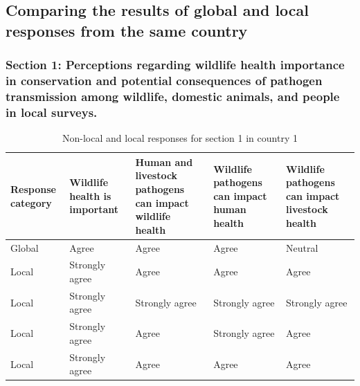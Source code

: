 \documentclass[
  letterpaper,
  DIV=11,
  numbers=noendperiod]{scrartcl}
\begin{document}
\hypertarget{comparing-the-results-of-global-and-local-responses-from-the-same-country}{%
\subsection{Comparing the results of global and local responses from the
same
country}\label{comparing-the-results-of-global-and-local-responses-from-the-same-country}}

\hypertarget{section-1-perceptions-regarding-wildlife-health-importance-in-conservation-and-potential-consequences-of-pathogen-transmission-among-wildlife-domestic-animals-and-people-in-local-surveys.-1}{%
\subsubsection{Section 1: Perceptions regarding wildlife health
importance in conservation and potential consequences of pathogen
transmission among wildlife, domestic animals, and people in local
surveys.}\label{section-1-perceptions-regarding-wildlife-health-importance-in-conservation-and-potential-consequences-of-pathogen-transmission-among-wildlife-domestic-animals-and-people-in-local-surveys.-1}}

\begin{table}[H]

\caption{Non-local and local responses for section 1 in country 1}
\centering
\begin{tabular}[t]{>{\raggedright\arraybackslash}p{2cm}|>{\raggedright\arraybackslash}p{3cm}|>{\raggedright\arraybackslash}p{3cm}|>{\raggedright\arraybackslash}p{3cm}|>{\raggedright\arraybackslash}p{3cm}}
\hline
Response
category & Wildlife health
is important & Human and livestock
pathogens can
impact wildlife
health & Wildlife pathogens can
impact human health & Wildlife pathogens can
impact livestock health\\
\hline
Global & Agree & Agree & Agree & Neutral\\
\hline
Local & Strongly agree & Agree & Agree & \vphantom{1} Agree\\
\hline
Local & Strongly agree & Strongly agree & Strongly agree & Strongly agree\\
\hline
Local & Strongly agree & Agree & Strongly agree & Agree\\
\hline
Local & Strongly agree & Agree & Agree & Agree\\
\hline
\end{tabular}
\end{table}
\end{document}
